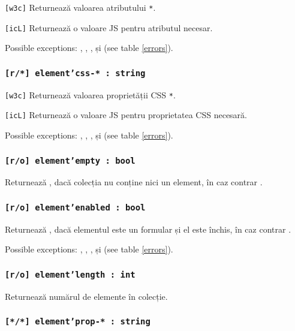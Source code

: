 \texttt{[w3c]} Returnează valoarea atributului \texttt{*}.

\texttt{[icL]} Returnează o valoare JS pentru atributul necesar.

Possible exceptions: , , ,  și  (see table \ref{errors}).

\subsubsection{\texttt{[r/*] element'css-* : string}}

\texttt{[w3c]} Returnează valoarea proprietății CSS \texttt{*}.

\texttt{[icL]} Returnează o valoare JS pentru proprietatea CSS necesară.

Possible exceptions: , , ,  și  (see table \ref{errors}).

\subsubsection{\texttt{[r/o] element'empty : bool}}

Returnează \true, dacă colecția nu conține nici un element, în caz contrar \false.

\subsubsection{\texttt{[r/o] element'enabled : bool}}

Returnează \false, dacă elementul este un formular și el este închis, în caz contrar \true.

Possible exceptions: , , ,  și  (see table \ref{errors}).

\subsubsection{\texttt{[r/o] element'length : int}}

Returnează numărul de elemente în colecție.

\subsubsection{\texttt{[*/*] element'prop-* : string}}

